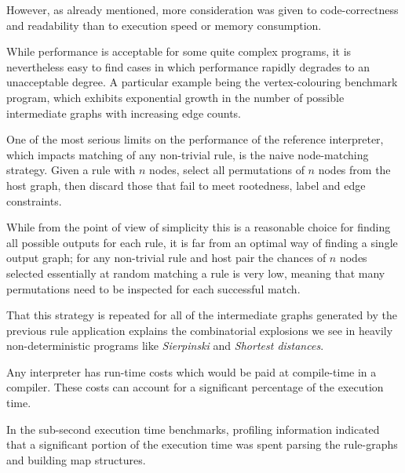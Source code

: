 However, as already mentioned, more consideration was given to code-correctness and readability than to execution speed or memory consumption.

While performance is acceptable for some quite complex programs, it is nevertheless easy to find cases in which performance rapidly degrades to an unacceptable degree. A particular example being the vertex-colouring benchmark program, which exhibits exponential growth in the number of possible intermediate graphs with increasing edge counts.

One of the most serious limits on the performance of the reference interpreter, which impacts matching of any non-trivial rule, is the naive node-matching strategy. Given a rule with $n$ nodes, select all permutations of $n$ nodes from the host graph, then discard those that fail to meet rootedness, label and edge constraints.

While from the point of view of simplicity this is a reasonable choice for finding all possible outputs for each rule, it is far from an optimal way of finding a single output graph; for any non-trivial rule and host pair the chances of $n$ nodes selected essentially at random matching a rule is very low, meaning that many permutations need to be inspected for each successful match.

That this strategy is repeated for all of the intermediate graphs generated by the previous rule application explains the combinatorial explosions we see in heavily non-deterministic programs like \textit{Sierpinski} and \textit{Shortest distances}.


Any interpreter has run-time costs which would be paid at compile-time in a compiler. These costs can account for a significant percentage of the execution time.

In the sub-second execution time benchmarks, profiling information indicated that a significant portion of the execution time was spent parsing the rule-graphs and building map structures.



